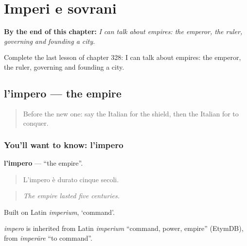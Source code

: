 
\chapter{Imperi e sovrani}
\label{ch:it-imperi-e-sovrani}

\begin{chapteropening}
\textbf{By the end of this chapter:} \emph{I can talk about empires: the emperor, the ruler, governing and founding a city.}

Complete the last lesson of chapter 328: I can talk about empires: the emperor, the ruler, governing and founding a city.
\end{chapteropening}

\section[l'impero]{l'impero — the empire}

\label{lesson:IT-C328-impero}



\begin{quote}
Before the new one: say the Italian for the shield, then the Italian for to conquer.
\end{quote}

\subsection*{You'll want to know: l'impero}
\textbf{l'impero} — \textquotedblleft{}the empire\textquotedblright{}.

\begin{quote}
L'impero è durato cinque secoli.
\end{quote}

\begin{quote}
\emph{The empire lasted five centuries.}
\end{quote}

Built on Latin \emph{imperium}, ‘command’.

\begin{cousinweb}
\emph{impero} is inherited from Latin \emph{imperium} \textquotedblleft{}command, power, empire\textquotedblright{} (EtymDB), from \emph{imperāre} \textquotedblleft{}to command\textquotedblright{}.
\end{cousinweb}

